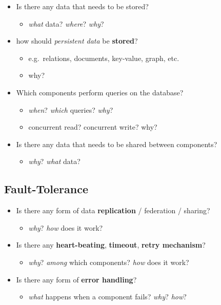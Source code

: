 \documentclass{scrartcl}
\begin{document}
\begin{itemize}
  \item Is there any data that needs to be stored?
  \begin{itemize}
    \item \emph{what} data? \emph{where}? \emph{why}?
  \end{itemize}
  
  \item how should \emph{persistent data} be \textbf{stored}?
  \begin{itemize}
    \item e.g.~relations, documents, key-value, graph, etc.
    \item why?
  \end{itemize}
  
  \item Which components perform queries on the database?
  \begin{itemize}
    \item \emph{when}? \emph{which} queries? \emph{why}?
    \item concurrent read? concurrent write? why?
  \end{itemize}
  
  \item Is there any data that needs to be shared between components?
  \begin{itemize}
    \item \emph{why}? \emph{what} data?
  \end{itemize}
\end{itemize}

\subsection{Fault-Tolerance}\label{fault-tolerance}

\begin{itemize}
  \item Is there any form of data \textbf{replication} / federation / sharing?
  \begin{itemize}
    \item \emph{why}? \emph{how} does it work?
  \end{itemize}
  
  \item Is there any \textbf{heart-beating}, \textbf{timeout}, \textbf{retry mechanism}?
  \begin{itemize}
    \item \emph{why}? \emph{among} which components? \emph{how} does it work?
  \end{itemize}
  
  \item Is there any form of \textbf{error handling}?
  \begin{itemize}
    \item \emph{what} happens when a component fails? \emph{why}? \emph{how}?
  \end{itemize}
\end{itemize}
\end{document}
